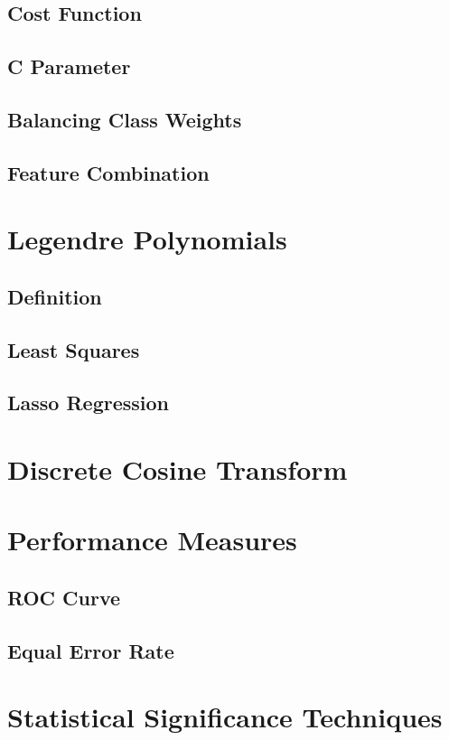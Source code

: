 \documentclass[11pt,a4paper]{tesis}
\begin{document}
		\subsection{Cost Function}
			
		\subsection{C Parameter}
			
		\subsection{Balancing Class Weights}
			
		\subsection{Feature Combination}
	\section{Legendre Polynomials}
		\subsection{Definition}
		\subsection{Least Squares}
		\subsection{Lasso Regression}
	\section{Discrete Cosine Transform}
	\section{Performance Measures}
		\subsection{ROC Curve}
		\subsection{Equal Error Rate}
			
	\section{Statistical Significance Techniques}
\end{document}
